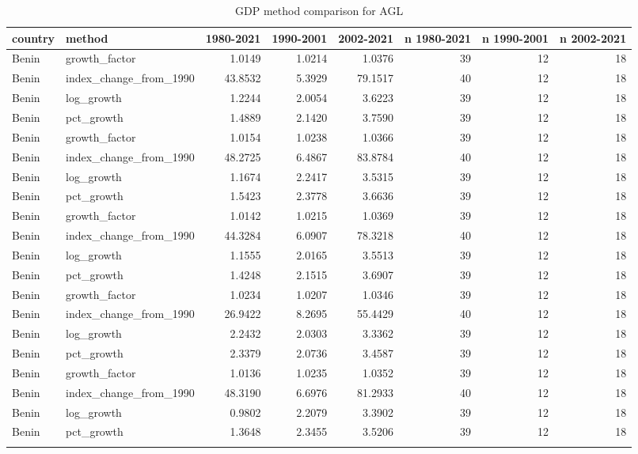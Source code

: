 \begin{table}

\caption{GDP method comparison for AGL}
\centering
\begin{tabular}[t]{llrrrrrr}
\toprule
country & method & 1980-2021 & 1990-2001 & 2002-2021 & n 1980-2021 & n 1990-2001 & n 2002-2021\\
\midrule
Benin & growth\_factor & 1.0149 & 1.0214 & 1.0376 & 39 & 12 & 18\\
Benin & index\_change\_from\_1990 & 43.8532 & 5.3929 & 79.1517 & 40 & 12 & 18\\
Benin & log\_growth & 1.2244 & 2.0054 & 3.6223 & 39 & 12 & 18\\
Benin & pct\_growth & 1.4889 & 2.1420 & 3.7590 & 39 & 12 & 18\\
Benin & growth\_factor & 1.0154 & 1.0238 & 1.0366 & 39 & 12 & 18\\
\addlinespace
Benin & index\_change\_from\_1990 & 48.2725 & 6.4867 & 83.8784 & 40 & 12 & 18\\
Benin & log\_growth & 1.1674 & 2.2417 & 3.5315 & 39 & 12 & 18\\
Benin & pct\_growth & 1.5423 & 2.3778 & 3.6636 & 39 & 12 & 18\\
Benin & growth\_factor & 1.0142 & 1.0215 & 1.0369 & 39 & 12 & 18\\
Benin & index\_change\_from\_1990 & 44.3284 & 6.0907 & 78.3218 & 40 & 12 & 18\\
\addlinespace
Benin & log\_growth & 1.1555 & 2.0165 & 3.5513 & 39 & 12 & 18\\
Benin & pct\_growth & 1.4248 & 2.1515 & 3.6907 & 39 & 12 & 18\\
Benin & growth\_factor & 1.0234 & 1.0207 & 1.0346 & 39 & 12 & 18\\
Benin & index\_change\_from\_1990 & 26.9422 & 8.2695 & 55.4429 & 40 & 12 & 18\\
Benin & log\_growth & 2.2432 & 2.0303 & 3.3362 & 39 & 12 & 18\\
\addlinespace
Benin & pct\_growth & 2.3379 & 2.0736 & 3.4587 & 39 & 12 & 18\\
Benin & growth\_factor & 1.0136 & 1.0235 & 1.0352 & 39 & 12 & 18\\
Benin & index\_change\_from\_1990 & 48.3190 & 6.6976 & 81.2933 & 40 & 12 & 18\\
Benin & log\_growth & 0.9802 & 2.2079 & 3.3902 & 39 & 12 & 18\\
Benin & pct\_growth & 1.3648 & 2.3455 & 3.5206 & 39 & 12 & 18\\
\addlinespace

\end{tabular}
\end{table}
